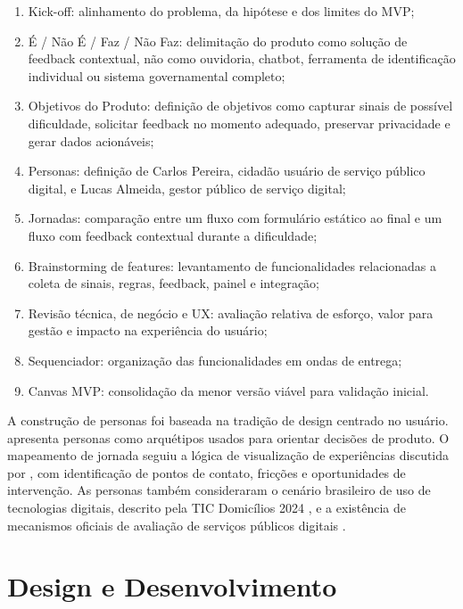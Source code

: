 \begin{enumerate}
\def\labelenumi{\arabic{enumi}.}
\item
  Kick-off: alinhamento do problema, da hipótese e dos limites do MVP;
\item
  É / Não É / Faz / Não Faz: delimitação do produto como solução de feedback contextual, não como ouvidoria, chatbot, ferramenta de identificação individual ou sistema governamental completo;
\item
  Objetivos do Produto: definição de objetivos como capturar sinais de possível dificuldade, solicitar feedback no momento adequado, preservar privacidade e gerar dados acionáveis;
\item
  Personas: definição de Carlos Pereira, cidadão usuário de serviço público digital, e Lucas Almeida, gestor público de serviço digital;
\item
  Jornadas: comparação entre um fluxo com formulário estático ao final e um fluxo com feedback contextual durante a dificuldade;
\item
  Brainstorming de features: levantamento de funcionalidades relacionadas a coleta de sinais, regras, feedback, painel e integração;
\item
  Revisão técnica, de negócio e UX: avaliação relativa de esforço, valor para gestão e impacto na experiência do usuário;
\item
  Sequenciador: organização das funcionalidades em ondas de entrega;
\item
  Canvas MVP: consolidação da menor versão viável para validação inicial.
\end{enumerate}

A construção de personas foi baseada na tradição de design centrado no usuário.  apresenta personas como arquétipos usados para orientar decisões de produto. O mapeamento de jornada seguiu a lógica de visualização de experiências discutida por , com identificação de pontos de contato, fricções e oportunidades de intervenção. As personas também consideraram o cenário brasileiro de uso de tecnologias digitais, descrito pela TIC Domicílios 2024 \cite{cgi2025}, e a existência de mecanismos oficiais de avaliação de serviços públicos digitais \cite{brasil2026}.

\section{Design e Desenvolvimento}
\label{sec:3.4}

